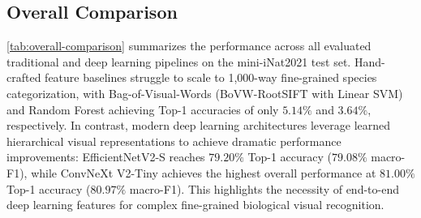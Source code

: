 \subsection{Overall Comparison}
\label{sec:overall-comparison}
\cref{tab:overall-comparison} summarizes the performance across all evaluated traditional and deep learning pipelines on the mini-iNat2021 test set. Hand-crafted feature baselines struggle to scale to 1{,}000-way fine-grained species categorization, with Bag-of-Visual-Words (BoVW-RootSIFT with Linear SVM) and Random Forest achieving Top-1 accuracies of only $5.14\%$ and $3.64\%$, respectively. In contrast, modern deep learning architectures leverage learned hierarchical visual representations to achieve dramatic performance improvements: EfficientNetV2-S reaches $79.20\%$ Top-1 accuracy ($79.08\%$ macro-F1), while ConvNeXt V2-Tiny achieves the highest overall performance at $81.00\%$ Top-1 accuracy ($80.97\%$ macro-F1). This highlights the necessity of end-to-end deep learning features for complex fine-grained biological visual recognition.

\begin{table}[t]
  \centering
  \caption{Overall comparison of all evaluated methods on the mini-iNat2021 test set.}
  \label{tab:overall-comparison}
  \setlength{\tabcolsep}{3pt}
  \scriptsize
\end{table}


